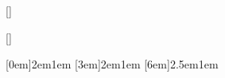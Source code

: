 \usepackage[utf8]{inputenc}
\usepackage{subfiles}
\usepackage[left=0.85in,right=0.85in,top=0.89in,bottom=1.15in]{geometry}
\usepackage{amsmath,amssymb,amsthm}
\usepackage{mathrsfs}
\usepackage{enumitem}
\usepackage{tikz-cd}
\usepackage{epigraph}
\usepackage[super]{nth}
\usepackage{titlesec,titletoc}
\usepackage{soul}
\usepackage[hidelinks]{hyperref}


\renewcommand{\rmdefault}{pplx}
\usepackage{eulervm}

\allowdisplaybreaks[1]



[\setcounter{section}{0}]
[\setcounter{subsection}{0}]



[0em]{\sc}{2em}{1em}
[3em]{\bfseries}{2em}{1em}
[6em]{}{2.5em}{1em}

\renewcommand{\contentsname}{\centering Contents}

